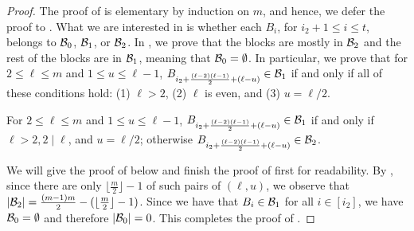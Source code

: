 \begin{proof}
The proof of  is elementary by induction on $m$, and hence, we defer the proof to . What we are interested in is whether each $B_i$, for $i_2+1\leq i\leq t$, belongs to ${\mathcal{B}}_0$, ${\mathcal{B}}_1$, or ${\mathcal{B}}_2$. In , we prove that the blocks are mostly in ${\mathcal{B}}_2$ and the rest of the blocks are in ${\mathcal{B}}_1$, meaning that ${\mathcal{B}}_0=\emptyset$. In particular, we prove that for $2\leq\ell\leq m$ and $1\leq u\leq\ell-1$, $B_{i_2+\frac{(\ell-2)(\ell-1)}{2}+(\ell-u)}\in{\ensuremath{\mathcal{B}}}_1$ if and only if all of these conditions hold: (1) $\ell>2$, (2) $\ell$ is even, and (3) $u=\ell/2$. 

\begin{claim}
For $2\leq\ell\leq m$ and $1\leq u\leq \ell-1$, $B_{i_2+\frac{(\ell-2)(\ell-1)}{2}+(\ell-u)}\in{\ensuremath{\mathcal{B}}}_1$ if and only if $\ell>2, 2\mid\ell$, and $u=\ell/2$; otherwise $B_{i_2+\frac{(\ell-2)(\ell-1)}{2}+(\ell-u)}\in{\ensuremath{\mathcal{B}}}_2$.
\end{claim}

We will give the proof of  below and finish the proof of  first for readability. By , since there are only $\lfloor\frac{m}{2}\rfloor-1$ of such pairs of $(\ell,u)$, we observe that $|{\mathcal{B}}_2|=\frac{(m-1)m}{2}-(\lfloor\frac{m}{2}\rfloor-1)$. Since we have that $B_i\in{\ensuremath{\mathcal{B}}}_1$ for all $i\in[i_2]$, we have ${\mathcal{B}}_0=\emptyset$ and therefore $|{\mathcal{B}}_0|=0$. This completes the proof of .
\end{proof}


